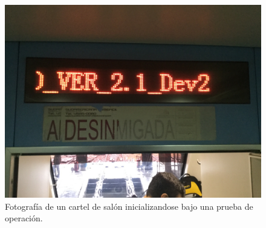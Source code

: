 \begin{figure}[ht]
	\centering
	\includegraphics[width=1\textwidth]{./Figures/cartelIniciando.JPG}
	\caption{Fotografía de un cartel de salón inicializandose bajo una prueba de operación.}
	\label{fig:cartelIniciando}
\end{figure}

